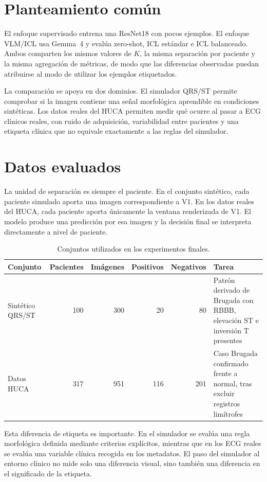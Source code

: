 \section{Planteamiento común}

El enfoque supervisado entrena una ResNet18 con pocos ejemplos. El enfoque VLM/ICL usa Gemma~4 y evalúa zero-shot, ICL estándar e ICL balanceado. Ambos comparten los mismos valores de \(K\), la misma separación por paciente y la misma agregación de métricas, de modo que las diferencias observadas puedan atribuirse al modo de utilizar los ejemplos etiquetados.

La comparación se apoya en dos dominios. El simulador QRS/ST permite comprobar si la imagen contiene una señal morfológica aprendible en condiciones sintéticas. Los datos reales del HUCA permiten medir qué ocurre al pasar a ECG clínicos reales, con ruido de adquisición, variabilidad entre pacientes y una etiqueta clínica que no equivale exactamente a las reglas del simulador.

\section{Datos evaluados}

La unidad de separación es siempre el paciente. En el conjunto sintético, cada paciente simulado aporta una imagen correspondiente a V1. En los datos reales del HUCA, cada paciente aporta únicamente la ventana renderizada de V1. El modelo produce una predicción por esa imagen y la decisión final se interpreta directamente a nivel de paciente.

\begin{table}[H]
  \centering
  \small
  \begin{tabularx}{\textwidth}{p{3cm}rrrrX}
    \toprule
    Conjunto & Pacientes & Imágenes & Positivos & Negativos & Tarea \\
    \midrule
    Sintético QRS/ST & 100 & 300 & 20 & 80 & Patrón derivado de Brugada con RBBB, elevación ST e inversión T presentes \\
    Datos HUCA & 317 & 951 & 116 & 201 & Caso Brugada confirmado frente a normal, tras excluir registros limítrofes \\
    \bottomrule
  \end{tabularx}
  \caption{Conjuntos utilizados en los experimentos finales.}
  \label{tab:datasets_finales}
\end{table}

Esta diferencia de etiqueta es importante. En el simulador se evalúa una regla morfológica definida mediante criterios explícitos, mientras que en los ECG reales se evalúa una variable clínica recogida en los metadatos. El paso del simulador al entorno clínico no mide solo una diferencia visual, sino también una diferencia en el significado de la etiqueta.


